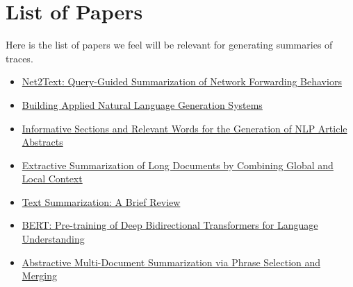 \section{List of Papers}

Here is the list of papers we feel will be relevant for generating summaries of traces.

\begin{itemize}
    \item \href{https://www.usenix.org/system/files/conference/nsdi18/nsdi18-birkner.pdf}{Net2Text: Query-Guided Summarization of Network Forwarding Behaviors}
    \item \href{https://pdfs.semanticscholar.org/728e/18fbf00f5a80e9a070db4f4416d66c7b28f4.pdf}{Building Applied Natural Language Generation Systems}
    \item \href{http://lepage-lab.ips.waseda.ac.jp/media/filer_public/0c/f4/0cf4a50c-8e44-44fe-a184-c3a4d0f0853e/li_tianjiao_janlp_2019.pdf}{Informative Sections and Relevant Words for the Generation of NLP Article Abstracts}
    \item \href{https://arxiv.org/pdf/1909.08089.pdf}{Extractive Summarization of Long Documents by Combining Global and Local Context}
    \item \href{https://www.researchgate.net/profile/Hamzeh_Alabool/publication/337653638_Text_Summarization_A_Brief_Review/links/5de5183792851c83645b72b9/Text-Summarization-A-Brief-Review.pdf}{Text Summarization: A Brief Review}
    \item \href{https://arxiv.org/abs/1810.04805}{BERT: Pre-training of Deep Bidirectional Transformers for Language Understanding}
    \item \href{http://www.cs.cmu.edu/~lbing/pub/acl2015-bing.pdf}{Abstractive Multi-Document Summarization via Phrase Selection and Merging}
\end{itemize}